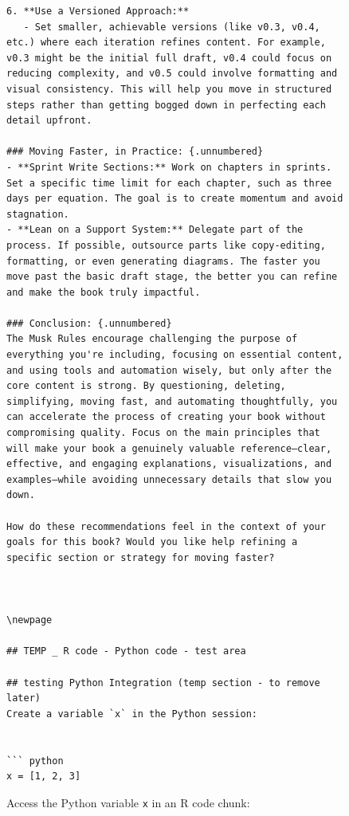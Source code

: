 \documentclass[
  12 pt,
  a4paper,
]{book}
\newenvironment{Shaded}{\begin{snugshade}}{\end{snugshade}}
\newcommand{\NormalTok}[1]{#1}
\newcommand{\SpecialCharTok}[1]{\textcolor[rgb]{0.81,0.36,0.00}{\textbf{#1}}}
\numberwithin{equation}{section}
\theoremstyle{plain}      %
\theoremstyle{definition} %
\theoremstyle{remark}     %
\theoremstyle{note}         %
\begin{document}
\begin{figure}
\begin{verbatim}
6. **Use a Versioned Approach:**
   - Set smaller, achievable versions (like v0.3, v0.4, etc.) where each iteration refines content. For example, v0.3 might be the initial full draft, v0.4 could focus on reducing complexity, and v0.5 could involve formatting and visual consistency. This will help you move in structured steps rather than getting bogged down in perfecting each detail upfront.

### Moving Faster, in Practice: {.unnumbered}
- **Sprint Write Sections:** Work on chapters in sprints. Set a specific time limit for each chapter, such as three days per equation. The goal is to create momentum and avoid stagnation.
- **Lean on a Support System:** Delegate part of the process. If possible, outsource parts like copy-editing, formatting, or even generating diagrams. The faster you move past the basic draft stage, the better you can refine and make the book truly impactful.
  
### Conclusion: {.unnumbered}
The Musk Rules encourage challenging the purpose of everything you're including, focusing on essential content, and using tools and automation wisely, but only after the core content is strong. By questioning, deleting, simplifying, moving fast, and automating thoughtfully, you can accelerate the process of creating your book without compromising quality. Focus on the main principles that will make your book a genuinely valuable reference—clear, effective, and engaging explanations, visualizations, and examples—while avoiding unnecessary details that slow you down.

How do these recommendations feel in the context of your goals for this book? Would you like help refining a specific section or strategy for moving faster?



\newpage

## TEMP _ R code - Python code - test area 

## testing Python Integration (temp section - to remove later)
Create a variable `x` in the Python session:


``` python
x = [1, 2, 3]
\end{verbatim}

Access the Python variable \texttt{x} in an R code chunk:

\begin{Shaded}
\end{Shaded}


\end{figure}
\end{document}
